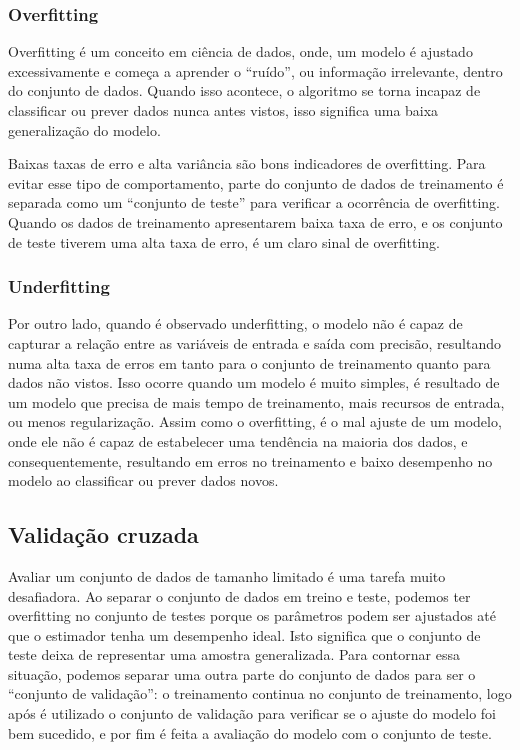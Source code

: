 \subsubsection{Overfitting}\label{sec:LABEL_CHP_4_SEC_A_SUB_F_A}
Overfitting é um conceito em ciência de dados, onde, um modelo é ajustado excessivamente e começa a aprender o ``ruído'', ou informação irrelevante, dentro do conjunto de dados. Quando isso acontece, o algoritmo se torna incapaz de classificar ou prever dados nunca antes vistos, isso significa uma baixa generalização do modelo. 

Baixas taxas de erro e alta variância são bons indicadores de overfitting. Para evitar esse tipo de comportamento, parte do conjunto de dados de treinamento é separada como um ``conjunto de teste'' para verificar a ocorrência de overfitting. Quando os dados de treinamento apresentarem baixa taxa de erro, e os conjunto de teste tiverem uma alta taxa de erro, é um claro sinal de overfitting.

\subsubsection{Underfitting}\label{sec:LABEL_CHP_4_SEC_A_SUB_F_B}
Por outro lado, quando é observado underfitting, o modelo não é capaz de capturar a relação entre as variáveis de entrada e saída com precisão, resultando numa alta taxa de erros em tanto para o conjunto de treinamento quanto para dados não vistos. Isso ocorre quando um modelo é muito simples, é resultado de um modelo que precisa de mais tempo de treinamento, mais recursos de entrada, ou menos regularização. Assim como o overfitting, é o mal ajuste de um modelo, onde ele não é capaz de estabelecer uma tendência na maioria dos dados, e consequentemente, resultando em erros no treinamento e baixo desempenho no modelo ao classificar ou prever dados novos.


\subsection{Validação cruzada}\label{sec:LABEL_CHP_4_SEC_A_SUB_G}

Avaliar um conjunto de dados de tamanho limitado é uma tarefa muito desafiadora. Ao separar o conjunto de dados em treino e teste, podemos ter overfitting no conjunto de testes porque os parâmetros podem ser ajustados até que o estimador tenha um desempenho ideal. Isto significa que o conjunto de teste deixa de representar uma amostra generalizada. Para contornar essa situação, podemos separar uma outra parte do conjunto de dados para ser o ``conjunto de validação'': o treinamento continua no conjunto de treinamento, logo após é utilizado o conjunto de validação para verificar se o ajuste do modelo foi bem sucedido, e por fim é feita a avaliação do modelo com o conjunto de teste.


